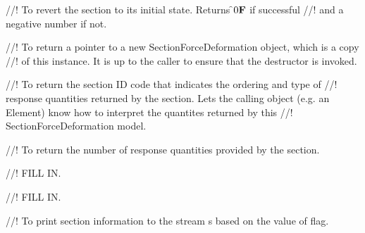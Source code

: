 //! To revert the section to its initial state. Returns \f$0{\bf F}$ if successful
//! and a negative number if not.

//! To return a pointer to a new SectionForceDeformation object, which is a copy 
//! of this instance. It is up to the caller to ensure that the destructor is invoked.

//! To return the section ID code that indicates the ordering and type of
//! response quantities returned by the section. Lets the calling object
(e.g. an Element) know how to interpret the quantites returned by this
//! SectionForceDeformation model.

//! To return the number of response quantities provided by the section.

//! FILL IN.

//! FILL IN.

//! To print section information to the stream \p s based on the value of \p flag.
